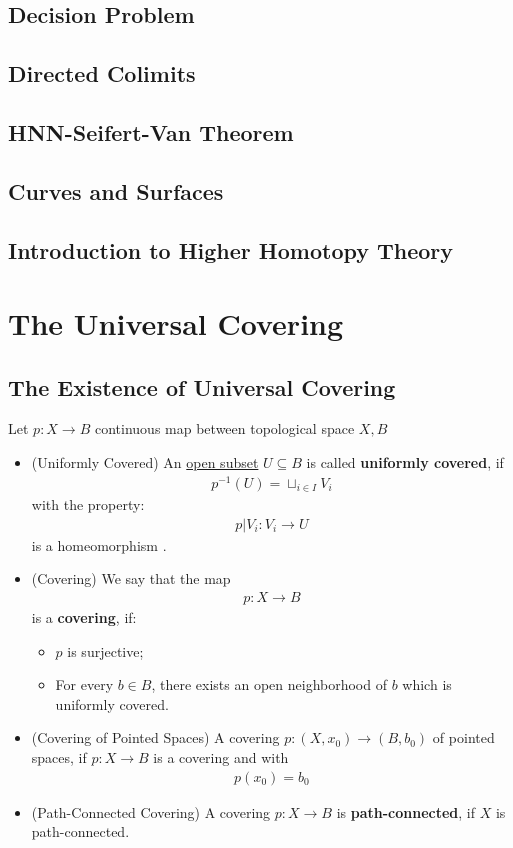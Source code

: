 \documentclass[Total.tex]{subfiles}
\begin{document}
		\section{Decision Problem}
		\section{Directed Colimits}
		\section{HNN-Seifert-Van Theorem}
		\section{Curves and Surfaces}
		\section{Introduction to Higher Homotopy Theory}
	\chapter{The Universal Covering}
		\section{The Existence of Universal Covering}
			\begin{Def} Let $p:X\rightarrow B$ continuous map between topological space $X,B$
				\begin{itemize}
					\item (Uniformly Covered) An \underline{open subset}  $U\subseteq B$ is called \textbf{uniformly covered}, if 
					\begin{gather*}
						p^{-1}(U)=\sqcup_{i\in I} V_i
					\end{gather*}
					with the property: 
					\begin{gather*}
						p|V_i:V_i\rightarrow U
					\end{gather*}
					is a homeomorphism .
					\item (Covering) We say that the map
					\begin{gather*}
						p:X\rightarrow B
					\end{gather*}
					is a \textbf{covering}, if:
					\begin{itemize}
						\item $p$ is surjective;
						\item For every $b\in B$, there exists an open neighborhood of $b$ which is uniformly covered. 
					\end{itemize}
					\item (Covering of Pointed Spaces) A covering $p:(X,x_0)\rightarrow (B,b_0)$ of pointed spaces, if $p:X\rightarrow B$ is a covering and with
					\begin{gather*}
						p(x_0)=b_0
					\end{gather*}
					\item (Path-Connected Covering) A covering $p:X\rightarrow B$ is \textbf{path-connected}, if $X$ is path-connected.
				\end{itemize}
			\end{Def}
			
\end{document}
